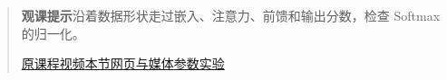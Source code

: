 \begin{quote}\small\textbf{观课提示}\quad 沿着数据形状走过嵌入、注意力、前馈和输出分数，检查 Softmax 的归一化。

\href{https://www.youtube.com/watch?v=wjZofJX0v4M}{原课程视频}\quad\href{https://vitael04213.github.io/3blue1brown-notes/lessons/gpt.html}{本节网页与媒体}\quad\href{https://vitael04213.github.io/3blue1brown-notes/lab.html\#attention}{参数实验}
\end{quote}
